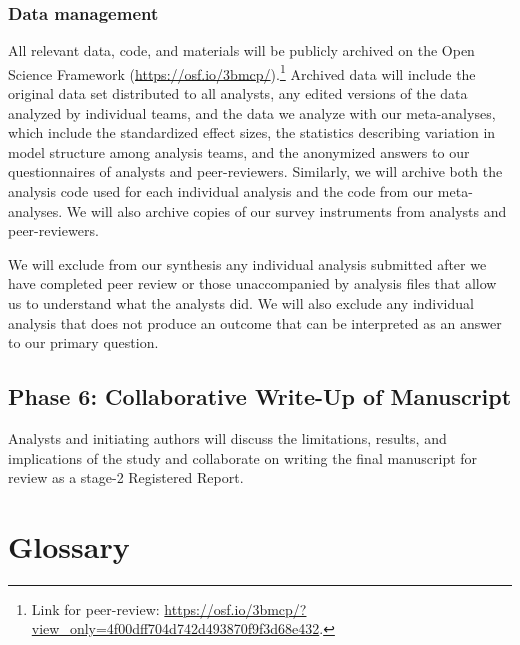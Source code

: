 \documentclass[Review,times,sageh]{sagej}
\begin{document}
\hypertarget{ana-archive}{%
\subsubsection{Data management}\label{ana-archive}}

All relevant data, code, and materials will be publicly archived on the Open Science Framework (\url{https://osf.io/3bmcp/}).\footnote{Link for peer-review: \url{https://osf.io/3bmcp/?view_only=4f00dff704d742d493870f9f3d68e432}.}
Archived data will include the original data set distributed to all analysts, any edited versions of the data analyzed by individual teams, and the data we analyze with our meta-analyses, which include the standardized effect sizes, the statistics describing variation in model structure among analysis teams, and the anonymized answers to our questionnaires of analysts and peer-reviewers.
Similarly, we will archive both the analysis code used for each individual analysis and the code from our meta-analyses.
We will also archive copies of our survey instruments from analysts and peer-reviewers.

We will exclude from our synthesis any individual analysis submitted after we have completed peer review or those unaccompanied by analysis files that allow us to understand what the analysts did.
We will also exclude any individual analysis that does not produce an outcome that can be interpreted as an answer to our primary question.

\hypertarget{phase-6-collaborative-write-up-of-manuscript}{%
\subsection{Phase 6: Collaborative Write-Up of Manuscript}\label{phase-6-collaborative-write-up-of-manuscript}}

Analysts and initiating authors will discuss the limitations, results, and implications of the study and collaborate on writing the final manuscript for review as a stage-2 Registered Report.

\appendix

\hypertarget{glossary}{%
\section{Glossary}\label{glossary}}
\end{document}
